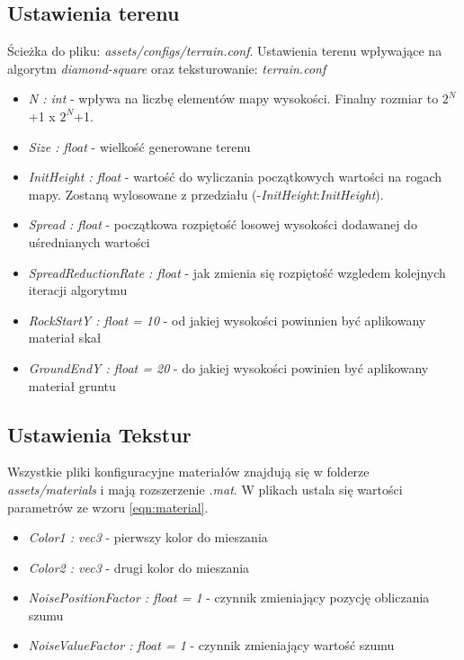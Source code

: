 \documentclass[inz,longabstract]{iithesis}
\begin{document}
        \subsection{Ustawienia terenu}
        Ścieżka do pliku: \textit{assets/configs/terrain.conf}. Ustawienia terenu wpływające na algorytm \textit{diamond-square} oraz teksturowanie:
        \textit{terrain.conf}
        \begin{itemize}
            \item \textit{N : int} - wpływa na liczbę elementów mapy wysokości. Finalny rozmiar to $2^N$+1 x $2^N$+1.
            \item \textit{Size : float} - wielkość generowane terenu 
            \item \textit{InitHeight : float} - wartość do wyliczania początkowych wartości na rogach mapy. Zostaną wylosowane z przedziału (-\textit{InitHeight}:\textit{InitHeight}).
            \item \textit{Spread : float} - początkowa rozpiętość losowej wysokości dodawanej do uśrednianych wartości
            \item \textit{SpreadReductionRate : float} - jak zmienia się rozpiętość wzgledem kolejnych iteracji algorytmu 
            \item \textit{RockStartY : float = 10} - od jakiej wysokości powinnien być aplikowany materiał skał
            \item \textit{GroundEndY : float = 20} - do jakiej wysokości powinien być aplikowany materiał gruntu
        \end{itemize}
        
        \subsection{Ustawienia Tekstur}
        Wszystkie pliki konfiguracyjne materiałów znajdują się w folderze \textit{assets/materials} i mają rozszerzenie \textit{.mat}. W plikach ustala się wartości parametrów ze wzoru \ref{eqn:material}. 
        \begin{itemize}
            \item \textit{Color1 : vec3} - pierwszy kolor do mieszania
            \item \textit{Color2 : vec3} - drugi kolor do mieszania
            \item \textit{NoisePositionFactor : float = 1} - czynnik zmieniający pozycję obliczania szumu 
            \item \textit{NoiseValueFactor : float = 1} - czynnik zmieniający wartość szumu
        \end{itemize}
        
\end{document}

